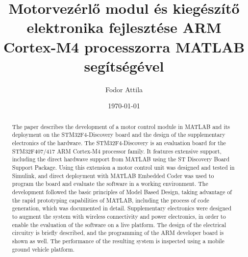 \documentclass[12pt]{article}
\title{Motorvezérlő modul és kiegészítő elektronika fejlesztése ARM Cortex-M4 processzorra MATLAB segítségével}
\author{Fodor Attila}
\date{\today}
\begin{document}
 




\maketitle

\begin{abstract}
The paper describes the development of a motor control module in MATLAB and its deployment on the STM32F4-Discovery board and the design of the supplementary electronics of the hardware.
The STM32F4-Discovery is an evaluation board for the STM32F407/417 ARM Cortex-M4 processor family. It features extensive support, including the direct hardwave support from MATLAB using the ST Discovery Board Support Package. Using this extension a motor control unit was designed and tested in Simulink, and direct deployment with MATLAB Embedded Coder was used to program the board and evaluate the software in a working environment.
The development followed the basic principles of Model Based Design, taking advantage of the rapid prototyping capabilities of MATLAB, including the process of code generation, which was documented in detail.
Supplementary electronics were designed to augment the system with wireless connectivity and power electronics, in order to enable the evaluation of the software on a live platform. The design of the electrical circuitry is briefly described, and the programming of the ARM developer board is shown as well.
The performance of the resulting system is inspected using a mobile ground vehicle platform.
\end{abstract}

\clearpage
{}








\end{document}
